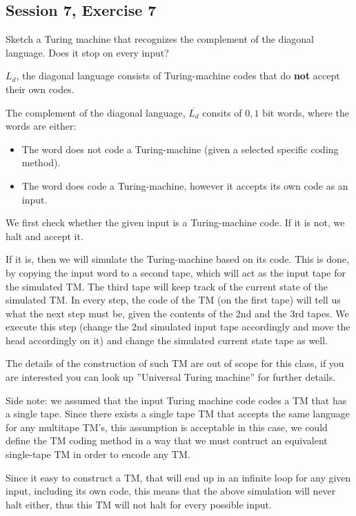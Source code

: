 \subsection {Session 7, Exercise 7}


Sketch a Turing machine that recognizes the complement of the diagonal language. Does it stop on every
input?


$L_d$, the diagonal language consists of Turing-machine codes that do \textbf{not} accept their own codes.

The complement of the diagonal language, $\overline{L_d}$ consits of $0,1$ bit words, where the words are either:
\begin{itemize}
    \item The word does not code a Turing-machine (given a selected specific coding method).
    \item The word does code a Turing-machine, however it accepts its own code as an input.
\end{itemize}

We first check whether the given input is a Turing-machine code. If it is not, we halt and accept it.

If it is, then we will simulate the Turing-machine based on its code. This is done, by copying the input word to a second tape, which will act as the input tape for the simulated TM. The third tape will keep track of the current state of the simulated TM. In every step, the code of the TM (on the first tape) will tell us what the next step must be, given the contents of the 2nd and the 3rd tapes. We execute this step (change the 2nd simulated input tape accordingly and move the head accordingly on it) and change the simulated current state tape as well.

The details of the construction of such TM are out of scope for this class, if you are interested you can look up ''Universal Turing machine'' for further details.

Side note: we assumed that the input Turing machine code codes a TM that has a single tape. Since there exists a single tape TM that accepts the same language for any multitape TM's, this assumption is acceptable in this case, we could define the TM coding method in a way that we must contruct an equivalent single-tape TM in order to encode any TM.

Since it easy to construct a TM, that will end up in an infinite loop for any given input, including its own code, this means that the above simulation will never halt either, thus this TM will not halt for every possible input.